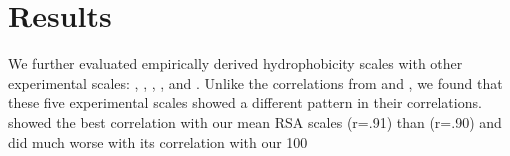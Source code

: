 \documentclass[12pt]{article}
\begin{document}
\section{Results}
We further evaluated empirically derived hydrophobicity scales with other experimental scales: \cite{Fauchere1983}, \cite{Radzicka1988}, \cite{Wimley1996}, \cite{MacCallum2007}, and \cite{Moon2011}. Unlike the correlations from \cite{Wolfenden1981} and \cite{Kyte1981}, we found that these five experimental scales showed a different pattern in their correlations. 
\cite{Fauchere1983} showed the best correlation with our mean RSA scales (r=.91) than \cite{Rose1985} (r=.90) and did much worse with its correlation with our 100%
\end{document}
